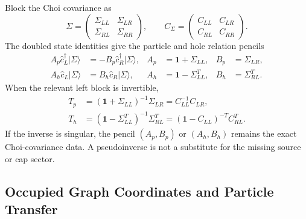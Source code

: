 \documentclass[aps,prb,onecolumn,nofootinbib,superscriptaddress]{revtex4-2}
\newcommand{\Id}{\mathbf{1}}
\newcommand{\ket}[1]{\lvert #1\rangle}
\newcommand{\chat}{\hat c}
\begin{document}
Block the Choi covariance as
\begin{equation}
  \Sigma=
  \begin{pmatrix}
    \Sigma_{LL} & \Sigma_{LR}\\
    \Sigma_{RL} & \Sigma_{RR}
  \end{pmatrix},
  \qquad
  C_\Sigma=
  \begin{pmatrix}
    C_{LL} & C_{LR}\\
    C_{RL} & C_{RR}
  \end{pmatrix}.
\end{equation}
The doubled state identities give the particle and hole relation pencils
\begin{align}
  A_p\chat_L^\dagger\ket{\Sigma}
  &=
  -B_p\chat_R^\dagger\ket{\Sigma},
  &
  A_p&=\Id+\Sigma_{LL},
  &
  B_p&=\Sigma_{LR},
  \label{eq:particle-pencil}
  \\
  A_h\chat_L\ket{\Sigma}
  &=
  B_h\chat_R\ket{\Sigma},
  &
  A_h&=\Id-\Sigma_{LL}^T,
  &
  B_h&=\Sigma_{RL}^T.
  \label{eq:hole-pencil}
\end{align}
When the relevant left block is invertible,
\begin{align}
  T_p
  &=
  (\Id+\Sigma_{LL})^{-1}\Sigma_{LR}
  =
  C_{LL}^{-1}C_{LR},
  \label{eq:Tp-cov}
  \\
  T_h
  &=
  (\Id-\Sigma_{LL}^T)^{-1}\Sigma_{RL}^T
  =
  (\Id-C_{LL})^{-T}C_{RL}^T .
  \label{eq:Th-cov}
\end{align}
If the inverse is singular, the pencil \((A_p,B_p)\) or \((A_h,B_h)\)
remains the exact Choi-covariance data.  A pseudoinverse is not a substitute
for the missing source or cap sector.

\subsection{Occupied Graph Coordinates and Particle Transfer}
\end{document}
